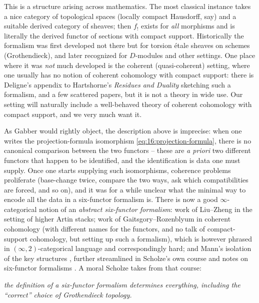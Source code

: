 \begin{remark}
\label{rmk:16:history}
This is a structure arising across mathematics. The most classical instance takes a
nice category of topological spaces (locally compact Hausdorff, say) and a suitable
derived category of sheaves; then $f_!$ exists for \emph{all} morphisms and is
literally the derived functor of sections with compact support. Historically the
formalism was first developed not there but for torsion \'etale sheaves on schemes
(Grothendieck), and later recognized for $D$-modules and other settings. One place
where it was \emph{not} much developed is the coherent (quasi-coherent) setting,
where one usually has no notion of coherent cohomology with compact support: there
is Deligne's appendix to Hartshorne's \emph{Residues and Duality}
\cite{Hartshorne_1966} sketching such a formalism, and a few scattered papers, but
it is not a theory in wide use. Our setting will naturally include a well-behaved
theory of coherent cohomology with compact support, and we very much want it.
\end{remark}

\begin{remark}
\label{rmk:16:abstract-6ff}
As Gabber would rightly object, the description above is imprecise: when one writes
the projection-formula isomorphism \eqref{eq:16:projection-formula}, there is no
canonical comparison between the two functors -- these are \emph{a priori} two
different functors that happen to be identified, and the identification is data one
must supply. Once one starts supplying such isomorphisms, coherence problems
proliferate (base-change twice, compare the two ways, ask which compatibilities are
forced, and so on), and it was for a while unclear what the minimal way to encode all
the data in a six-functor formalism is. There is now a good $\infty$-categorical
notion of an \emph{abstract six-functor formalism}: work of Liu--Zheng
\cite{liu2024enhancedoperationsbasechange} in the setting of higher Artin stacks;
work of Gaitsgory--Rozenblyum \cite{gaitsgory2017study} in coherent cohomology (with
different names for the functors, and no talk of compact-support cohomology, but
setting up such a formalism), which is however phrased in $(\infty,2)$-categorical
language and correspondingly hard; and Mann's isolation of the key structures
\cite{mann2022padic6functorformalismrigidanalytic}, further streamlined in Scholze's
own course and notes on six-functor formalisms \cite{scholze2023six}. A moral Scholze
takes from that course:
\begin{center}
\emph{the definition of a six-functor formalism determines everything, including the
``correct'' choice of Grothendieck topology.}
\end{center}
\end{remark}

